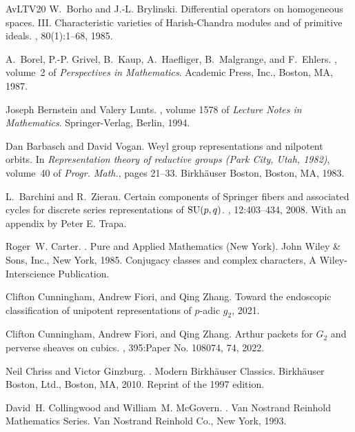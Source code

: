 \documentclass[a4paper, 11pt]{article}
\newcommand{\etalchar}[1]{$^{#1}$}
\begin{document}
\begin{thebibliography}{AvLTV20}
W.~Borho and J.-L. Brylinski.
\newblock Differential operators on homogeneous spaces. {III}. {C}haracteristic
  varieties of {H}arish-{C}handra modules and of primitive ideals.
, 80(1):1--68, 1985.

\bibitem[BGK{\etalchar{+}}87]{Boreletal}
A.~Borel, P.-P. Grivel, B.~Kaup, A.~Haefliger, B.~Malgrange, and F.~Ehlers.
, volume~2 of {\em Perspectives in
  Mathematics}.
\newblock Academic Press, Inc., Boston, MA, 1987.

Joseph Bernstein and Valery Lunts.
, volume 1578 of {\em Lecture
  Notes in Mathematics}.
\newblock Springer-Verlag, Berlin, 1994.

Dan Barbasch and David Vogan.
\newblock Weyl group representations and nilpotent orbits.
\newblock In {\em Representation theory of reductive groups ({P}ark {C}ity,
  {U}tah, 1982)}, volume~40 of {\em Progr. Math.}, pages 21--33. Birkh\"auser
  Boston, Boston, MA, 1983.

L.~Barchini and R.~Zierau.
\newblock Certain components of {S}pringer fibers and associated cycles for
  discrete series representations of {${\rm SU}(p,q)$}.
, 12:403--434, 2008.
\newblock With an appendix by Peter E. Trapa.

Roger~W. Carter.
.
\newblock Pure and Applied Mathematics (New York). John Wiley \& Sons, Inc.,
  New York, 1985.
\newblock Conjugacy classes and complex characters, A Wiley-Interscience
  Publication.

Clifton Cunningham, Andrew Fiori, and Qing Zhang.
\newblock Toward the endoscopic classification of unipotent representations of
  $p$-adic $g_2$, 2021.

Clifton Cunningham, Andrew Fiori, and Qing Zhang.
\newblock Arthur packets for {$G_2$} and perverse sheaves on cubics.
, 395:Paper No. 108074, 74, 2022.

Neil Chriss and Victor Ginzburg.
.
\newblock Modern Birkh\"auser Classics. Birkh\"auser Boston, Ltd., Boston, MA,
  2010.
\newblock Reprint of the 1997 edition.

David~H. Collingwood and William~M. McGovern.
.
\newblock Van Nostrand Reinhold Mathematics Series. Van Nostrand Reinhold Co.,
  New York, 1993.


\end{thebibliography}
\end{document}
